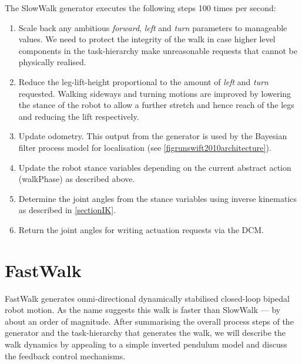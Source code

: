 \documentclass[pdftex,11pt,a4paper]{report}
\begin{document}
The SlowWalk generator executes the following steps 100 times per second:
\begin{enumerate}
\item Scale back any ambitious \emph{forward}, \emph{left} and \emph{turn} parameters to manageable values. We need to protect the integrity of the walk in case higher level components in the task-hierarchy make unreasonable requests that cannot be physically realised.
\item Reduce the leg-lift-height proportional to the amount of \emph{left} and \emph{turn} requested. Walking sideways and turning motions are improved by lowering the stance of the robot to allow a further stretch and hence reach of the legs and reducing the lift respectively. 
\item Update odometry. This output from the generator is used by the Bayesian filter process model for localisation (see \autoref{figrunswift2010architecture}).
\item Update the robot stance variables depending on the current abstract action (walkPhase) as described above.
\item Determine the joint angles from the stance variables using inverse kinematics as described in \autoref{sectionIK}.
\item Return the joint angles for writing actuation requests via the DCM.
\end{enumerate}

\section{FastWalk} \label{sectionFastwalk}

FastWalk generates omni-directional dynamically stabilised closed-loop bipedal robot motion. As the name suggests this walk is faster than SlowWalk --- by about an order of magnitude.  After summarising the overall process steps of the generator and the task-hierarchy that generates the walk, we will describe the walk dynamics by appealing to a simple inverted pendulum model and discuss the feedback control mechanisms.
\end{document}
